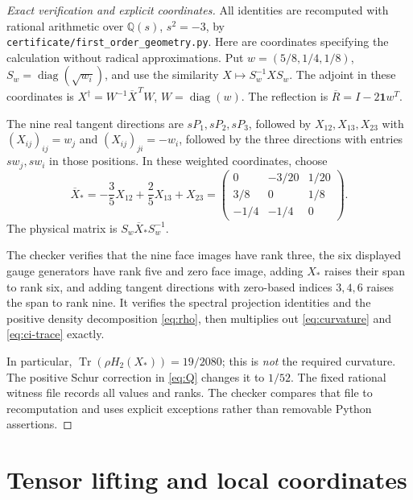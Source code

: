\documentclass[11pt]{article}
\theoremstyle{remark}\newtheorem{remark}[theorem]{Remark}
\newcommand{\Q}{\mathbb Q}
\newcommand{\Tr}{\operatorname{Tr}}
\newcommand{\diag}{\operatorname{diag}}
\begin{document}
\begin{proof}[Exact verification and explicit coordinates]
All identities are recomputed with rational arithmetic over $\Q(s)$, $s^2=-3$, by \texttt{certificate/first\_order\_geometry.py}. Here are coordinates specifying the calculation without radical approximations. Put $w=(5/8,1/4,1/8)$, $S_w=\diag(\sqrt{w_i})$, and use the similarity $X\mapsto S_w^{-1}XS_w$. The adjoint in these coordinates is $X^\dagger=W^{-1}\overline X^{\,T}W$, $W=\diag(w)$. The reflection is $\overline R=I-2\mathbf1w^T$.

The nine real tangent directions are $sP_1,sP_2,sP_3$, followed by $X_{12},X_{13},X_{23}$ with $(X_{ij})_{ij}=w_j$ and $(X_{ij})_{ji}=-w_i$, followed by the three directions with entries $sw_j,sw_i$ in those positions. In these weighted coordinates, choose
\begin{equation}\label{eq:flat-explicit}
 \overline X_*=-\frac35X_{12}+\frac25X_{13}+X_{23}
 =\begin{pmatrix}
 0&-3/20&1/20\\ 3/8&0&1/8\\ -1/4&-1/4&0
 \end{pmatrix}.
\end{equation}
The physical matrix is $S_w\overline X_*S_w^{-1}$.

The checker verifies that the nine face images have rank three, the six displayed gauge generators have rank five and zero face image, adding $X_*$ raises their span to rank six, and adding tangent directions with zero-based indices $3,4,6$ raises the span to rank nine. It verifies the spectral projection identities and the positive density decomposition \eqref{eq:rho}, then multiplies out \eqref{eq:curvature} and \eqref{eq:ci-trace} exactly.

In particular, $\Tr(\rho H_2(X_*))=19/2080$; this is \emph{not} the required curvature. The positive Schur correction in \eqref{eq:Q} changes it to $1/52$. The fixed rational witness file records all values and ranks. The checker compares that file to recomputation and uses explicit exceptions rather than removable Python assertions.
\end{proof}

\section{Tensor lifting and local coordinates}
\end{document}
